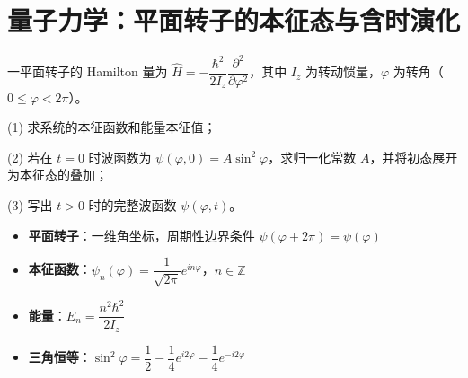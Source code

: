 \section{量子力学：平面转子的本征态与含时演化}
\label{sec:planar-rotor}

\begin{modelbox}[题目：平面转子的本征态与矩形波包的演化]
一平面转子的 Hamilton 量为 $\hat H=-\dfrac{\hbar^2}{2I_z}\dfrac{\partial^2}{\partial\varphi^2}$，其中 $I_z$ 为转动惯量，$\varphi$ 为转角（$0\leq\varphi<2\pi$）。

(1) 求系统的本征函数和能量本征值；

(2) 若在 $t=0$ 时波函数为 $\psi(\varphi,0)=A\sin^2\varphi$，求归一化常数 $A$，并将初态展开为本征态的叠加；

(3) 写出 $t>0$ 时的完整波函数 $\psi(\varphi,t)$。
\end{modelbox}

\begin{tipbox}[考点快速分析]
\begin{itemize}
    \item \textbf{平面转子}：一维角坐标，周期性边界条件 $\psi(\varphi+2\pi)=\psi(\varphi)$
    \item \textbf{本征函数}：$\psi_n(\varphi)=\dfrac{1}{\sqrt{2\pi}}e^{in\varphi}$，$n\in\mathbb{Z}$
    \item \textbf{能量}：$E_n=\dfrac{n^2\hbar^2}{2I_z}$
    \item \textbf{三角恒等}：$\sin^2\varphi=\dfrac{1}{2}-\dfrac{1}{4}e^{i2\varphi}-\dfrac{1}{4}e^{-i2\varphi}$
\end{itemize}
\end{tipbox}

